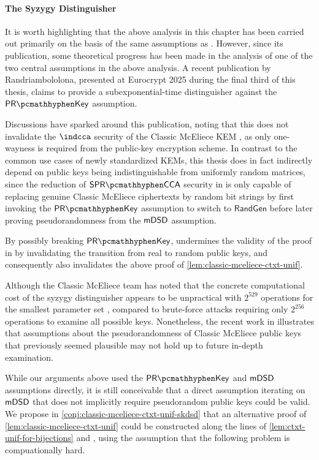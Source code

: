 \paragraph{The Syzygy Distinguisher}

It is worth highlighting that the above analysis in this chapter has been carried out primarily on the basis of the same assumptions as \cite{EC:Xagawa22}. However, since its publication, some theoretical progress has been made in the analysis of one of the two central assumptions in the above analysis. A recent publication by Randriambololona, presented at Eurocrypt 2025 during the final third of this thesis, \cite{cryptoeprint:2024/1193} claims to provide a subexponential-time distinguisher against the $\prkey$ assumption.

Discussions have sparked around this publication, noting that this does not invalidate the $\indcca$ security of the Classic McEliece KEM \cite{mceliece-529-20250417}, as only one-wayness is required from the public-key encryption scheme.
In contrast to the common use cases of newly standardized KEMs, this thesis does in fact indirectly depend on public keys being indistinguishable from uniformly random matrices, since the reduction of $\sprcca$ security in \cite{EC:Xagawa22} is only capable of replacing genuine Classic McEliece ciphertexts by random bit strings by first invoking the $\prkey$ assumption to switch to $\mathsf{RandGen}$ before later proving pseudorandomness from the $\mathsf{mDSD}$ assumption.

By possibly breaking $\prkey$, \cite{cryptoeprint:2024/1193} undermines the validity of the proof in \cite{EC:Xagawa22} by invalidating the transition from real to random public keys, and consequently also invalidates the above proof of \cref{lem:classic-mceliece-ctxt-unif}.

Although the Classic McEliece team has noted that the concrete computational cost of the syzygy distinguisher appears to be unpractical with $2^{529}$ operations for the smallest parameter set \cite{mceliece-529-20250417}, compared to brute-force attacks requiring only $2^{256}$ operations to examine all possible keys. Nonetheless, the recent work in \cite{cryptoeprint:2024/1193} illustrates that assumptions about the pseudorandomness of Classic McEliece public keys that previously seemed plausible may not hold up to future in-depth examination.

While our arguments above used the $\prkey$ and $\mathsf{mDSD}$ assumptions directly, it is still conceivable that a direct assumption iterating on $\mathsf{mDSD}$ that does not implicitly require pseudorandom public keys could be valid.
We propose in \cref{conj:classic-mceliece-ctxt-unif-skdsd} that an alternative proof of \cref{lem:classic-mceliece-ctxt-unif} could be constructed along the lines of \cref{lem:ctxt-unif-for-bijections} and \cite{EC:Xagawa22}, using the assumption that the following problem is compuationally hard.


